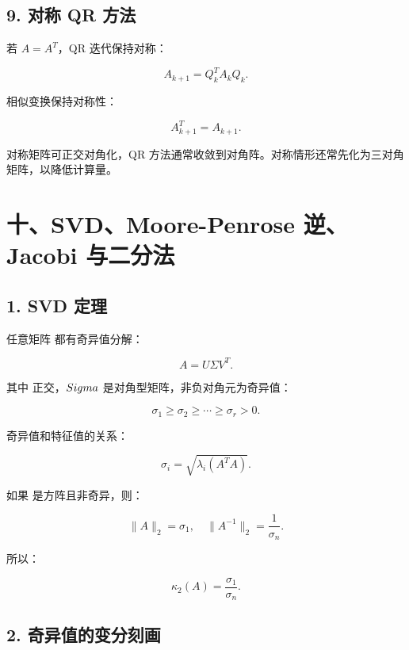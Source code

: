 \documentclass[11pt,a4paper]{ctexart}
\newcommand{\code}[1]{\begingroup\ttfamily\small #1\endgroup}
\begin{document}

\subsection*{9. 对称 QR 方法}


若 $A=A^T$，QR 迭代保持对称：

\[
A_{k+1}=Q_k^TA_kQ_k.
\]

相似变换保持对称性：

\[
A_{k+1}^T=A_{k+1}.
\]

对称矩阵可正交对角化，QR 方法通常收敛到对角阵。对称情形还常先化为三对角矩阵，以降低计算量。


\section*{十、SVD、Moore-Penrose 逆、Jacobi 与二分法}



\subsection*{1. SVD 定理}


任意矩阵 \code{} 都有奇异值分解：

\[
A=U\Sigma V^T.
\]

其中 \code{} 正交，$\\Sigma$ 是对角型矩阵，非负对角元为奇异值：

\[
\sigma_1\ge \sigma_2\ge \cdots\ge \sigma_r>0.
\]

奇异值和特征值的关系：

\[
\sigma_i=\sqrt{\lambda_i(A^TA)}.
\]

如果 \code{} 是方阵且非奇异，则：

\[
\|A\|_2=\sigma_1,
\quad
\|A^{-1}\|_2=\frac{1}{\sigma_n}.
\]

所以：

\[
\kappa_2(A)=\frac{\sigma_1}{\sigma_n}.
\]


\subsection*{2. 奇异值的变分刻画}
\end{document}
